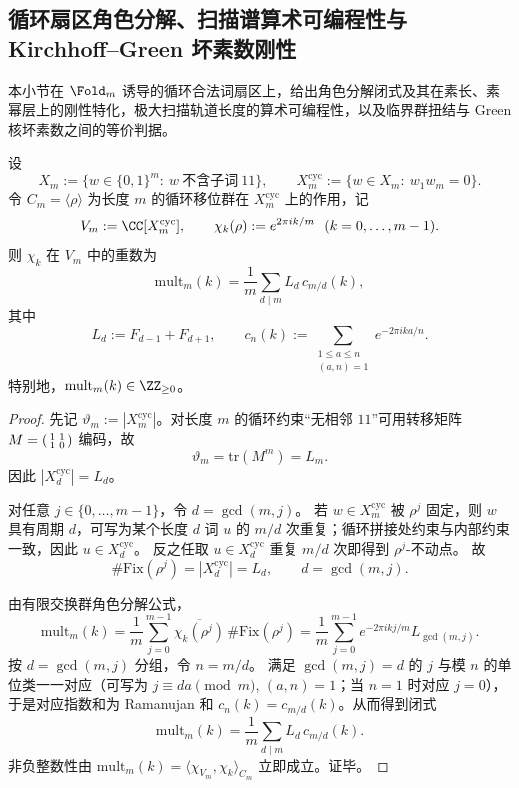 \subsection{循环扇区角色分解、扫描谱算术可编程性与 Kirchhoff--Green 坏素数刚性}\label{subsec:conclusion-cyclic-sector-scan-spectrum-kirchhoff-green-bad-prime-rigidity}
本小节在 \(\Fold_m\) 诱导的循环合法词扇区上，给出角色分解闭式及其在素长、素幂层上的刚性特化，极大扫描轨道长度的算术可编程性，以及临界群扭结与 Green 核坏素数之间的等价判据。

\begin{theorem}\label{thm:conclusion-cyclic-zeckendorf-sector-character-closed-form}
设
\[
X_m:=\{w\in\{0,1\}^m:\ w\ \text{不含子词}\ 11\},
\qquad
X_m^{\mathrm{cyc}}:=\{w\in X_m:\ w_1w_m=0\}.
\]
令 \(C_m=\langle\rho\rangle\) 为长度 \(m\) 的循环移位群在 \(X_m^{\mathrm{cyc}}\) 上的作用，记
\[
V_m:=\CC[X_m^{\mathrm{cyc}}],
\qquad
\chi_k(\rho):=e^{2\pi i k/m}\ \ (k=0,\dots,m-1).
\]
则 \(\chi_k\) 在 \(V_m\) 中的重数为
\[
\mathrm{mult}_m(k)
=\frac1m\sum_{d\mid m}L_d\,c_{m/d}(k),
\]
其中
\[
L_d:=F_{d-1}+F_{d+1},
\qquad
c_n(k):=\sum_{\substack{1\le a\le n\\(a,n)=1}}e^{-2\pi i ka/n}.
\]
特别地，\(\mathrm{mult}_m(k)\in\ZZ_{\ge 0}\)。
\end{theorem}
\begin{proof}
先记 \(\vartheta_m:=|X_m^{\mathrm{cyc}}|\)。对长度 \(m\) 的循环约束“无相邻 \(11\)”可用转移矩阵
\(
M=\begin{psmallmatrix}1&1\\ 1&0\end{psmallmatrix}
\)
编码，故
\[
\vartheta_m=\mathrm{tr}(M^m)=L_m.
\]
因此 \(|X_d^{\mathrm{cyc}}|=L_d\)。

对任意 \(j\in\{0,\dots,m-1\}\)，令 \(d=\gcd(m,j)\)。
若 \(w\in X_m^{\mathrm{cyc}}\) 被 \(\rho^j\) 固定，则 \(w\) 具有周期 \(d\)，可写为某个长度 \(d\) 词 \(u\) 的 \(m/d\) 次重复；循环拼接处约束与内部约束一致，因此 \(u\in X_d^{\mathrm{cyc}}\)。
反之任取 \(u\in X_d^{\mathrm{cyc}}\) 重复 \(m/d\) 次即得到 \(\rho^j\)-不动点。
故
\[
\#\mathrm{Fix}(\rho^j)=|X_d^{\mathrm{cyc}}|=L_d,\qquad d=\gcd(m,j).
\]

由有限交换群角色分解公式，
\[
\mathrm{mult}_m(k)
=\frac1m\sum_{j=0}^{m-1}\overline{\chi_k(\rho^j)}\,\#\mathrm{Fix}(\rho^j)
=\frac1m\sum_{j=0}^{m-1}e^{-2\pi i kj/m}L_{\gcd(m,j)}.
\]
按 \(d=\gcd(m,j)\) 分组，令 \(n=m/d\)。
满足 \(\gcd(m,j)=d\) 的 \(j\) 与模 \(n\) 的单位类一一对应（可写为 \(j\equiv da\pmod m\), \((a,n)=1\)；当 \(n=1\) 时对应 \(j=0\)），
于是对应指数和为 Ramanujan 和 \(c_n(k)=c_{m/d}(k)\)。从而得到闭式
\[
\mathrm{mult}_m(k)=\frac1m\sum_{d\mid m}L_d\,c_{m/d}(k).
\]
非负整数性由 \(\mathrm{mult}_m(k)=\langle\chi_{V_m},\chi_k\rangle_{C_m}\) 立即成立。证毕。
\end{proof}

